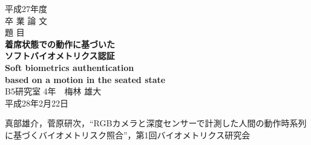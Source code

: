 \documentclass[12pt,twoside]{jreport}  %
\begin{document}
\begin{titlepage}
\parindent=0in
\begin{center}
\Large
\vspace*{3zh}
平成27年度\\
卒 業 論 文\\
\vspace*{3zh}
題 目 \\
{\LARGE\bf
着席状態での動作に基づいた\\
ソフトバイオメトリクス認証\\
Soft biometrics authentication\\
based on a motion in the seated state\\
}
\vspace*{3zh}
B5研究室 4年　梅林 雄大\\[1cm]
平成28年2月22日\\
\vspace*{5mm}
\end{center}
\end{titlepage}

\setcounter{page}{1}   %
\tableofcontents       %
\listoffigures         %
\listoftables          %
\newpage


\setcounter{page}{1}     %
\setlength{\baselineskip}{20pt}








\newpage
{}
\begin{thebibliography}{99}%
真部雄介，菅原研次，“RGBカメラと深度センサーで計測した人間の動作時系列に基づくバイオメトリスク照合”，第1回バイオメトリクス研究会
\end{thebibliography}


\end{document}
